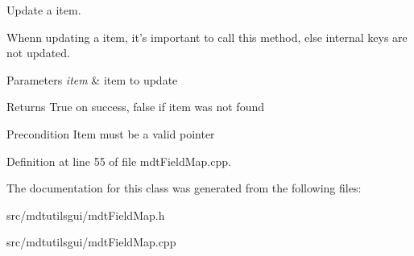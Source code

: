 Update a item. 

Whenn updating a item, it's important to call this method, else internal keys are not updated.


\begin{DoxyParams}{Parameters}
{\em item} & item to update \\
\hline
\end{DoxyParams}
\begin{DoxyReturn}{Returns}
True on success, false if item was not found 
\end{DoxyReturn}
\begin{DoxyPrecond}{Precondition}
Item must be a valid pointer 
\end{DoxyPrecond}


Definition at line 55 of file mdtFieldMap.cpp.



The documentation for this class was generated from the following files:\begin{DoxyCompactItemize}
\item 
src/mdtutilsgui/mdtFieldMap.h\item 
src/mdtutilsgui/mdtFieldMap.cpp\end{DoxyCompactItemize}
